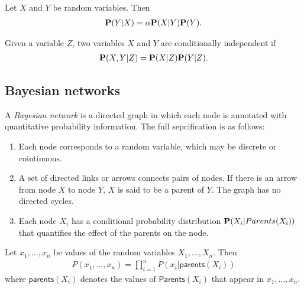 \documentclass{article}
\begin{document}
\begin{theorem}
    Let $X$ and $Y$ be random variables. Then
    \begin{align*}
        \P(Y|X) = \alpha \P(X|Y)\P(Y).
    \end{align*}
\end{theorem}

\begin{definition}[R\&N p. 498]
    Given a variable $Z$, two variables $X$ and $Y$ are conditionally independent
    if
    \begin{align*}
        \P(X,Y|Z) = \P(X|Z)\P(Y|Z).
    \end{align*}
\end{definition}

\subsection{Bayesian networks}

\begin{definition}[R\&N p. 511]
    A \emph{Bayesian network} is a directed graph in which each node is
    annotated with quantitative probability information. The full sepcification
    is as follows:
    \begin{enumerate}
        \item Each node corresponds to a random variable, which may be discrete or cointinuous.
        \item A set of directed links or arrows connects pairs of nodes. If there is an arrow
              from node $X$ to node $Y$, $X$ is said to be a parent of $Y$. The graph has no directed cycles.
        \item Each node $X_i$ has a conditional probability distribution $\P(X_i|Parents(X_i))$ that
              quantifies the effect of the parents on the node.
    \end{enumerate}
\end{definition}

\begin{proposition}[R\&N p. 513]
    Let $x_1, ..., x_n$ be values of the random variables $X_1,...,X_n$. Then
    \begin{align*}
        P(x_1, ..., x_n) = \prod_{i=1}^n P(x_i | \textsf{parents}(X_i))
    \end{align*}
    where $\textsf{parents}(X_i)$ denotes the values of $\textsf{Parents}(X_i)$ that
    appear in $x_1, ..., x_n$.
\end{proposition}
\end{document}
